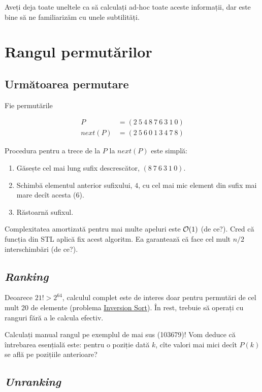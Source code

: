 \documentclass[../main.tex]{subfiles}
\begin{document}
Aveți deja toate uneltele ca să calculați ad-hoc toate aceste informații, dar este bine să ne familiarizăm cu unele subtilități.

\section{Rangul permutărilor}

\subsection{Următoarea permutare}

Fie permutările

\begin{align*}
P &= (2\ 5\ 4\ 8\ 7\ 6\ 3\ 1\ 0)\\
next(P) &= (2\ 5\ 6\ 0\ 1\ 3\ 4\ 7\ 8)
\end{align*}

Procedura pentru a trece de la $P$ la $next(P)$ este simplă:

\begin{enumerate}
  \item Găsește cel mai lung sufix descrescător, $(8\ 7\ 6\ 3\ 1\ 0)$.
  \item Schimbă elementul anterior sufixului, $4$, cu cel mai mic element din sufix mai mare decît acesta ($6$).
  \item Răstoarnă sufixul.
\end{enumerate}

Complexitatea amortizată pentru mai multe apeluri este $\mathcal{O}(1)$ (de ce?). Cred că funcția din STL  aplică fix acest algoritm. Ea garantează că face cel mult $n/2$ interschimbări (de ce?).

\subsection{\textit{Ranking}}

Deoarece $21! > 2^{64}$, calculul complet este de interes doar pentru permutări de cel mult 20 de elemente (problema \hyperref[problem:inversion-sort]{Inversion Sort}). În rest, trebuie să operați cu ranguri fără a le calcula efectiv.

Calculați manual rangul pe exemplul de mai sus (103679)! Vom deduce că întrebarea esențială este: pentru o poziție dată $k$, cîte valori mai mici decît $P(k)$ se află pe pozițiile anterioare?

\subsection{\textit{Unranking}}
\end{document}
